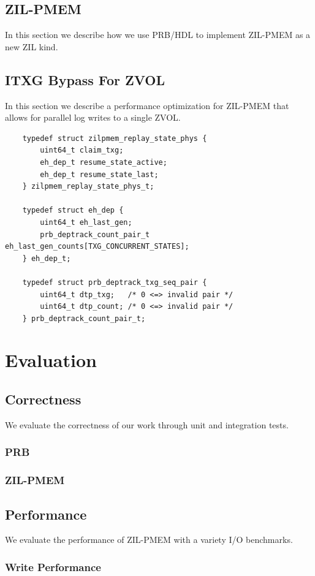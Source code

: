 \documentclass[12pt,a4paper,twoside]{book}
\begin{document}
\section{ZIL-PMEM}\label{sec:zilpmem}
In this section we describe how we use PRB/HDL to implement ZIL-PMEM as a new ZIL kind.

\section{ITXG Bypass For ZVOL}\label{sec:itxgbypass}
In this section we describe a performance optimization for ZIL-PMEM that allows for parallel log writes to a single ZVOL.



\begin{lstlisting}
    typedef struct zilpmem_replay_state_phys {
        uint64_t claim_txg;
        eh_dep_t resume_state_active;
        eh_dep_t resume_state_last;
    } zilpmem_replay_state_phys_t;
    
    typedef struct eh_dep {
        uint64_t eh_last_gen;
        prb_deptrack_count_pair_t eh_last_gen_counts[TXG_CONCURRENT_STATES];
    } eh_dep_t;
    
    typedef struct prb_deptrack_txg_seq_pair {
        uint64_t dtp_txg;	/* 0 <=> invalid pair */
        uint64_t dtp_count;	/* 0 <=> invalid pair */
    } prb_deptrack_count_pair_t;
    \end{lstlisting}
    

\chapter{Evaluation}\label{ch:eval}
\section{Correctness}
We evaluate the correctness of our work through unit and integration tests.
\subsection{PRB}
\subsection{ZIL-PMEM}
\section{Performance}
We evaluate the performance of ZIL-PMEM with a variety I/O benchmarks.
\subsection{Write Performance}
\end{document}

